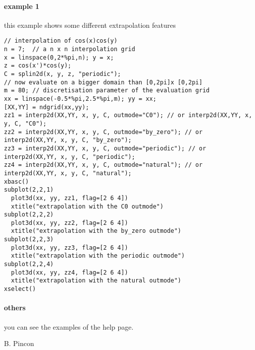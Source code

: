 
\begin{examples}

\paragraph{example 1} this example shows some different extrapolation features
\begin{Verbatim}
// interpolation of cos(x)cos(y)
n = 7;  // a n x n interpolation grid
x = linspace(0,2*%pi,n); y = x;
z = cos(x')*cos(y);
C = splin2d(x, y, z, "periodic");
// now evaluate on a bigger domain than [0,2pi]x [0,2pi]
m = 80; // discretisation parameter of the evaluation grid
xx = linspace(-0.5*%pi,2.5*%pi,m); yy = xx;
[XX,YY] = ndgrid(xx,yy);
zz1 = interp2d(XX,YY, x, y, C, outmode="C0"); // or interp2d(XX,YY, x, y, C, "C0");
zz2 = interp2d(XX,YY, x, y, C, outmode="by_zero"); // or interp2d(XX,YY, x, y, C, "by_zero");
zz3 = interp2d(XX,YY, x, y, C, outmode="periodic"); // or interp2d(XX,YY, x, y, C, "periodic");
zz4 = interp2d(XX,YY, x, y, C, outmode="natural"); // or interp2d(XX,YY, x, y, C, "natural");
xbasc()
subplot(2,2,1)
  plot3d(xx, yy, zz1, flag=[2 6 4])
  xtitle("extrapolation with the C0 outmode")
subplot(2,2,2)
  plot3d(xx, yy, zz2, flag=[2 6 4])
  xtitle("extrapolation with the by_zero outmode")
subplot(2,2,3)
  plot3d(xx, yy, zz3, flag=[2 6 4])
  xtitle("extrapolation with the periodic outmode")
subplot(2,2,4)
  plot3d(xx, yy, zz4, flag=[2 6 4])
  xtitle("extrapolation with the natural outmode")
xselect()
\end{Verbatim}

\paragraph{others} you can see the examples of the
 help page.

\end{examples}

\begin{manseealso}
\end{manseealso}

\begin{authors}
B. Pincon
\end{authors}


